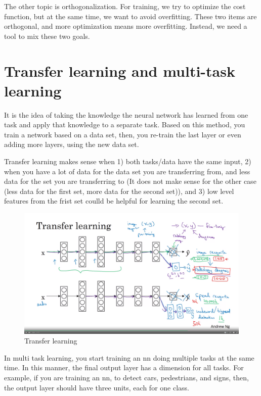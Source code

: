 \documentclass[12pt]{report}
\begin{document}
The other topic is orthogonalization. For training, we try to optimize the cost function, but at the same time, we want to avoid overfitting. These two items are orthogonal, and more optimization means more overfitting. Instead, we need a tool to mix these two goals.

\section{Transfer learning and multi-task learning}

It is the idea of taking the knowledge the neural network has learned from one task and apply that knowledge to a separate task. Based on this method, you train a network based on a data set, then, you re-train the last layer or even adding more layers, using the new data set.

Transfer learning makes sense when 1) both tasks/data have the same input, 2) when you have a lot of data for the data set you are transferring from, and less data for the set you are transferring to (It does not make sense for the other case (less data for the first set, more data for the second set)), and 3) low level features from the frist set coulld be helpful for learning the second set.

\begin{figure}[H]
  \centering
  \includegraphics[trim =0.0cm 0.0cm 0.0cm 0.0cm, clip, scale=0.12]{pics/transferLearning.png}
  \caption{Transfer learning}
\end{figure}

In multi task learning, you start training an nn doing multiple tasks at the same time. In this manner, the final output layer has a dimension for all tasks. For example, if you are training an nn, to detect cars, pedestrians, and signs, then, the output layer should have three units, each for one class.
\end{document}
